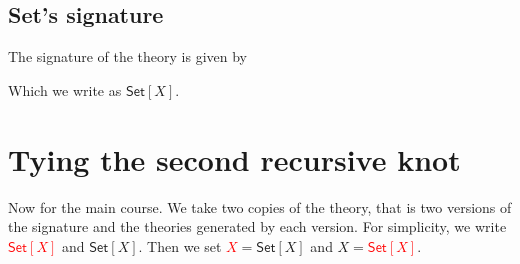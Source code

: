 \subsection{Set's signature}
The signature of the theory is given by

Which we write as $\mathsf{Set}[X]$.

\section{Tying the second recursive knot}
Now for the main course. We take two copies of the theory, that is two
versions of the signature and the theories generated by each version. For simplicity, we write \textcolor{red}{$\mathsf{Set}[X]$} and $\mathsf{Set}[X]$. Then we set \textcolor{red}{$X$}$=\mathsf{Set}[X]$ and $X=$\textcolor{red}{$\mathsf{Set}[X]$}.





